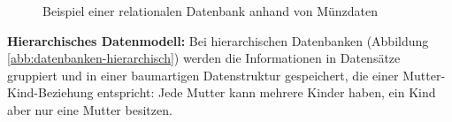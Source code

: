\begin{figure}[h!tb]
\begin{center}
	\end{center}
	\caption{Beispiel einer relationalen Datenbank anhand von Münzdaten}
	\label{abb:datenbanken-relational}
\end{figure}


{\bfseries Hierarchisches Datenmodell:} Bei hierarchischen Datenbanken (Abbildung \ref{abb:datenbanken-hierarchisch}) werden die Informationen in Datensätze gruppiert und in einer baumartigen Datenstruktur gespeichert, die einer Mutter-Kind-Beziehung entspricht: Jede Mutter kann mehrere Kinder haben, ein Kind aber nur eine Mutter besitzen.

